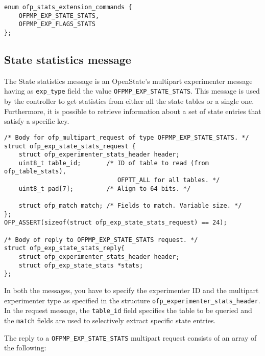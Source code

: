 \scriptsize\begin{verbatim}
enum ofp_stats_extension_commands {
    OFPMP_EXP_STATE_STATS,      
    OFPMP_EXP_FLAGS_STATS
};
\end{verbatim}\normalsize
\subsection{State statistics message}

The State statistics message is an OpenState's multipart experimenter message having as \texttt{exp\_type} field the value \texttt{OFPMP\_EXP\_STATE\_STATS}.
This message is used by the controller to get statistics from either all the state tables or a single one. Furthermore, it is possible to retrieve information about a set of state entries that satisfy a specific key.

\scriptsize\begin{verbatim}
/* Body for ofp_multipart_request of type OFPMP_EXP_STATE_STATS. */
struct ofp_exp_state_stats_request {
    struct ofp_experimenter_stats_header header;
    uint8_t table_id;       /* ID of table to read (from ofp_table_stats),
                               OFPTT_ALL for all tables. */
    uint8_t pad[7];         /* Align to 64 bits. */
    
    struct ofp_match match; /* Fields to match. Variable size. */
};
OFP_ASSERT(sizeof(struct ofp_exp_state_stats_request) == 24);

/* Body of reply to OFPMP_EXP_STATE_STATS request. */
struct ofp_exp_state_stats_reply{
    struct ofp_experimenter_stats_header header;
    struct ofp_exp_state_stats *stats;
};
\end{verbatim}\normalsize
In both the messages, you have to specify the experimenter ID and the multipart experimenter type as specified in the structure \texttt{ofp\_experimenter\_stats\_header}.
In the request message, the \texttt{table\_id} field specifies the table to be queried and the \texttt{match} fields are used to selectively extract specific state entries.

The reply to a \texttt{OFPMP\_EXP\_STATE\_STATS} multipart request consists of an array of the following:


